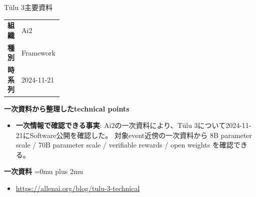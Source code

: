 \begin{technicalnote}{Tülu 3}{主要資料}
\begingroup
\begin{tabularx}{\linewidth}{@{}>{\bfseries}p{0.22\linewidth}X@{}}
組織 & Ai2 \\
種別 & Framework \\
時系列 & 2024-11-21 \\
\end{tabularx}
\smallskip
{\bfseries 一次資料から整理したtechnical points}
\begin{itemize}[leftmargin=1.5em,itemsep=0.35em]
\item \textbf{一次情報で確認できる事実}: Ai2の一次資料により、Tülu 3について2024-11-21にSoftware公開を確認した。 対象event近傍の一次資料から 8B parameter scale / 70B parameter scale / verifiable rewards / open weights を確認できる。
\end{itemize}
\begin{minipage}{\linewidth}
\begin{samepage}
{\bfseries 一次資料}
\begingroup\sloppy
\Urlmuskip=0mu plus 2mu\relax
\begin{itemize}[leftmargin=1.5em,itemsep=0.25em]
\item {\scriptsize\url{https://allenai.org/blog/tulu-3-technical}}
\end{itemize}
\endgroup
\end{samepage}
\end{minipage}
\endgroup
\end{technicalnote}
\medskip

